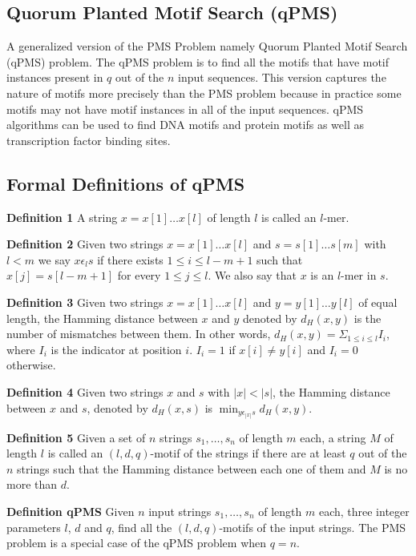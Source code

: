 \subsection{Quorum Planted Motif Search (qPMS)}
A generalized version of the PMS Problem namely Quorum Planted Motif Search (qPMS) problem. The qPMS problem is to find all the motifs that have motif instances present in $ q $ out of the $ n $ input sequences. This version captures the nature of motifs more precisely than the PMS problem because in practice some motifs may not have motif instances in all of the input sequences. qPMS algorithms can be used to find DNA motifs and protein motifs as well as transcription factor binding sites. 

\subsection{Formal Definitions of qPMS}
\qquad \textbf{Definition 1 } A string $ x=x[1]\dots x[l] $ of length $ l $ is called an $ l $-mer. 

\qquad \textbf{Definition 2 } Given two strings $ x=x[1]\dots x[l] $ and $ s=s[1]\dots s[m] $ with $ l<m $ we say $ x\epsilon_{l}s $ if there exists $ 1\leq i \leq l-m+1 $ such that $ x[j]=s[l-m+1] $ for every $ 1\leq j\leq l $. We also say that $ x $ is an $ l $-mer in $ s $.

\qquad \textbf{Definition 3 } Given two strings $ x=x[1]\dots x[l] $ and $ y=y[1]\dots y[l] $ of equal length, the Hamming distance between $ x $ and $ y $ denoted by $ d_{H}(x,y) $ is the number of mismatches between them. In other words, $ d_{H}(x,y)=\Sigma_{1\leq i \leq l}I_{i} $, where $ I_{i} $ is the indicator at position $ i $. $ I_{i}=1 $ if $ x[i]\neq y[i] $ and $ I_{i}=0 $ otherwise.

\qquad \textbf{Definition 4 } Given two strings $ x $ and $ s $ with $ |x|<|s| $, the Hamming distance between $ x $ and $ s $, denoted by $ d_{H}(x,s) $ is $ \min _{y\epsilon _{|x|}s} d_{H}(x,y) $.

\qquad \textbf{Definition 5 } Given a set of $ n $ strings $ s_{1},\dots,s_{n} $ of length $ m $ each, a string $ M $ of length $ l $ is called an $ (l, d, q) $-motif of the strings if there are at least $ q $ out of the $ n $ strings such that the Hamming distance between each one of them and $ M $ is no more than $ d $.

\qquad \textbf{Definition qPMS } Given $ n $ input strings $ s_{1},\dots,s_{n} $ of length $ m $ each, three integer parameters $ l $, $ d $ and $ q $, find all the $ (l,d,q) $-motifs of the input strings. The PMS problem is a special case of the qPMS problem when $ q=n $.

